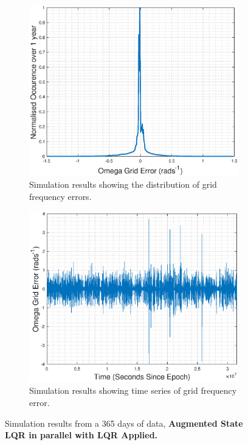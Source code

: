 \begin{figure}
\centering
\begin{subfigure}{.5\textwidth}
  \centering
  \includegraphics[width=1\linewidth]{images/results/omegafreq.eps}
  \caption{Simulation results showing the distribution of grid frequency errors.}
  \label{fig:omegaspread}
\end{subfigure}%
\begin{subfigure}{.5\textwidth}
  \centering
  \includegraphics[width=1\linewidth]{images/results/omegayear.eps}
  \caption{Simulation results showing time series of grid frequency error.}
  \label{fig:omegayearseries}
\end{subfigure}
\caption{Simulation results from a 365 days of data, {\bf Augmented State LQR in parallel with LQR Applied.}}
\label{fig:omegastuff}
\end{figure}




